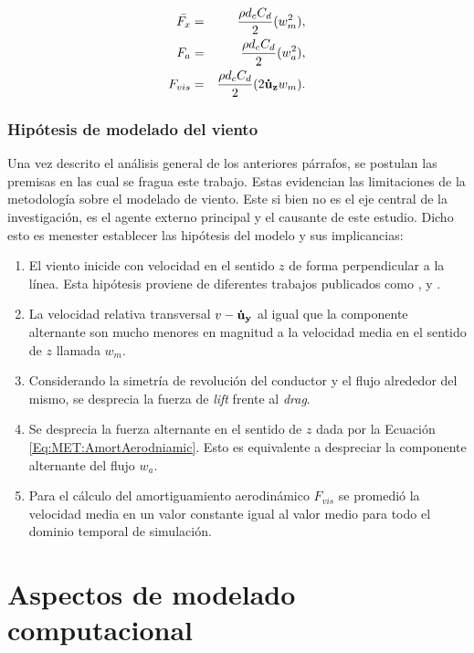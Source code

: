 \begin{eqnarray}
\bar{F_x} &=&  \frac{\rho d_c C_d}{2} (w_m^2),\\
F_a &=&  \frac{\rho d_c C_d}{2} (w_a^2),\\
\label{Eq:MET:AmortAerodniamic}
F_{vis}  &=& \frac{\rho d_c C_d}{2} (2 \text{$\bf{\dot{u}}_{z}$} w_m).
\end{eqnarray}  


\subsubsection{Hipótesis de modelado del viento} \label{Sec:MET:HipotesisdeTrabajo}
Una vez descrito el análisis general de los anteriores párrafos, se postulan las premisas en las cual se fragua este trabajo. Estas evidencian las limitaciones de la metodología sobre el modelado de viento. Este si bien no es el eje central de la investigación, es el agente externo principal y el causante de este estudio. Dicho esto es menester establecer las hipótesis del modelo y sus implicancias:

\begin{enumerate}
\item El viento inicide con velocidad en el sentido $z$ de forma perpendicular a la línea. Esta hipótesis proviene de diferentes trabajos publicados como \citep{duranona2009analysis}, \citep{yang2016nonlinear} y \citep{stengel2017measurements}.
\item La velocidad relativa transversal $v-\bf{\dot{u}}_{y}$ al igual que la componente alternante son mucho menores en magnitud a la velocidad media en el sentido de $z$ llamada $w_m$.
\item Considerando la simetría de revolución del conductor y el flujo alrededor del mismo, se desprecia la fuerza de \textit{lift} frente al \textit{drag}.
\item Se desprecia la fuerza alternante en el sentido de $z$ dada por la Ecuación \eqref{Eq:MET:AmortAerodniamic}. Esto es equivalente a despreciar la componente alternante del flujo $w_a$.
\item Para el cálculo del amortiguamiento aerodinámico $F_{vis}$ se promedió la velocidad media en un valor constante igual al valor medio para todo el dominio temporal de simulación.
\end{enumerate}

\section{Aspectos de modelado computacional}\label{Sec:MET:ModeladoComput}
